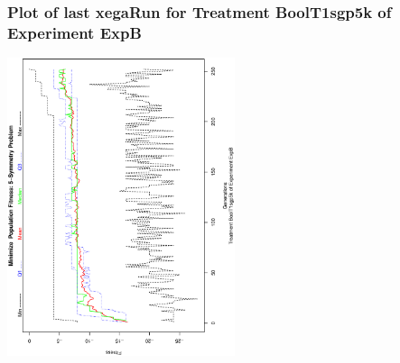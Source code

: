  \begin{frame}
 \frametitle{ Plot of last xegaRun for Treatment BoolT1sgp5k of Experiment ExpB }
 \begin{center}
\includegraphics[width=0.5\textwidth, angle=-90]
{ExpBPlotPopStatsFigure008.eps}
 \end{center}
 \label{report/ExpBPlotPopStatsFigure008.eps}  
 \end{frame}

